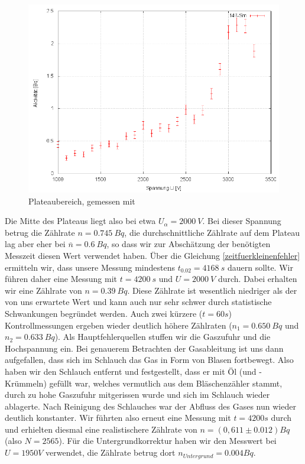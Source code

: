 \begin{figure}[H]
 \centering \includegraphics[width=0.9\linewidth]{Messwerte/plots/Sm147_plateau.png}
 \caption{Plateaubereich, gemessen mit }
\end{figure}

Die Mitte des Plateaus liegt also bei etwa $U_{\alpha} = 2000\ V$. Bei dieser Spannung betrug die Zählrate $n = 0.745\ Bq$, die durchschnittliche Zählrate auf dem Plateau lag aber eher bei $\overline{n} = 0.6\ Bq$, so dass wir zur Abschätzung der benötigten Messzeit diesen Wert verwendet haben. Über die Gleichung \ref{zeitfuerkleinenfehler} ermitteln wir, dass unsere Messung mindestens $t_{0.02} = 4168\ s$ dauern sollte. Wir führen daher eine Messung mit $t = 4200\ s$ und $ U = 2000\ V$ durch. Dabei erhalten wir eine Zählrate von $n = 0.39\ Bq$. Diese Zählrate ist wesentlich niedriger als der von uns erwartete Wert und kann auch nur sehr schwer durch statistische Schwankungen begründet werden. Auch zwei kürzere ($t = 60s$) Kontrollmessungen ergeben wieder deutlich höhere Zählraten ($n_1 = 0.650\ Bq$ und $n_2 = 0.633\ Bq$). Als Hauptfehlerquellen stuffen wir die Gaszufuhr und die Hochspannung ein. Bei genauerem Betrachten der Gasableitung ist uns dann aufgefallen, dass sich im Schlauch das Gas in Form von Blasen fortbewegt. Also haben wir den Schlauch entfernt und festgestellt, dass er mit Öl (und -Krümmeln) gefüllt war, welches vermutlich aus dem Bläschenzähler stammt, durch zu hohe Gaszufuhr mitgerissen wurde und sich im Schlauch wieder ablagerte. Nach Reinigung des Schlauches war der Abfluss des Gases nun wieder deutlich konstanter. Wir führten also erneut eine Messung mit $t=4200s$ durch und erhielten diesmal eine realistischere Zählrate von $n = (0,611 \pm 0.012) Bq$ (also $N = 2565$). Für die Untergrundkorrektur haben wir den Messwert bei $U = 1950V$ verwendet, die Zählrate betrug dort $n_{Untergrund} = 0.004 Bq$.


